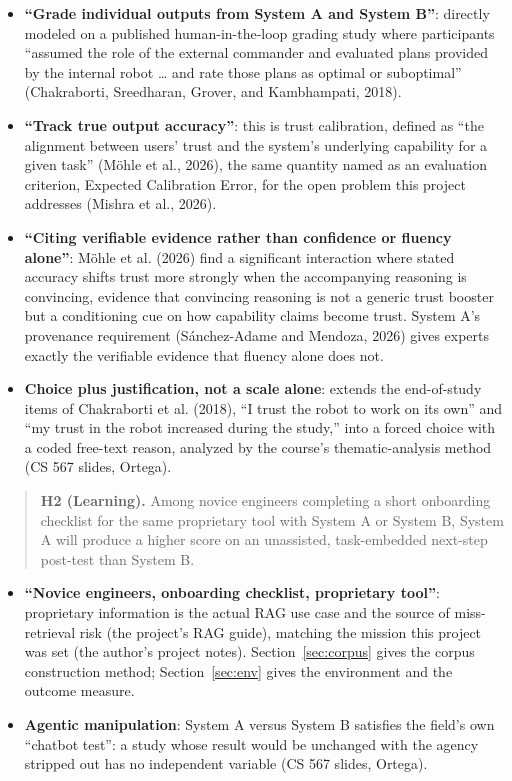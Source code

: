 \documentclass[9pt,conference]{IEEEtran}
\begin{document}
\begin{itemize}
\item \textbf{``Grade individual outputs from System A and System
  B''}: directly modeled on a published human-in-the-loop grading
  study where participants ``assumed the role of the external
  commander and evaluated plans provided by the internal robot \ldots
  and rate those plans as optimal or suboptimal'' (Chakraborti,
  Sreedharan, Grover, and Kambhampati, 2018).
\item \textbf{``Track true output accuracy''}: this is trust
  calibration, defined as ``the alignment between users' trust and
  the system's underlying capability for a given task'' (Möhle et
  al., 2026), the same quantity named as an evaluation criterion,
  Expected Calibration Error, for the open problem this project
  addresses (Mishra et al., 2026).
\item \textbf{``Citing verifiable evidence rather than confidence or
  fluency alone''}: Möhle et al. (2026) find a significant
  interaction where stated accuracy shifts trust more strongly when
  the accompanying reasoning is convincing, evidence that convincing
  reasoning is not a generic trust booster but a conditioning cue on
  how capability claims become trust. System A's provenance
  requirement (Sánchez-Adame and Mendoza, 2026) gives experts exactly
  the verifiable evidence that fluency alone does not.
\item \textbf{Choice plus justification, not a scale alone}: extends
  the end-of-study items of Chakraborti et al. (2018), ``I trust the
  robot to work on its own'' and ``my trust in the robot increased
  during the study,'' into a forced choice with a coded free-text
  reason, analyzed by the course's thematic-analysis method (CS 567
  slides, Ortega).
\end{itemize}

\newpage
\begin{quote}\small
\textbf{H2 (Learning).} Among novice engineers completing a short
onboarding checklist for the same proprietary tool with System A or
System B, System A will produce a higher score on an unassisted,
task-embedded next-step post-test than System B.
\end{quote}

\begin{itemize}
\item \textbf{``Novice engineers, onboarding checklist, proprietary
  tool''}: proprietary information is the actual RAG use case and the
  source of miss-retrieval risk (the project's RAG guide), matching
  the mission this project was set (the author's project notes).
  Section~\ref{sec:corpus} gives the corpus construction method;
  Section~\ref{sec:env} gives the environment and the outcome measure.
\item \textbf{Agentic manipulation}: System A versus System B
  satisfies the field's own ``chatbot test'': a study whose result
  would be unchanged with the agency stripped out has no independent
  variable (CS 567 slides, Ortega).
\end{itemize}
\end{document}
